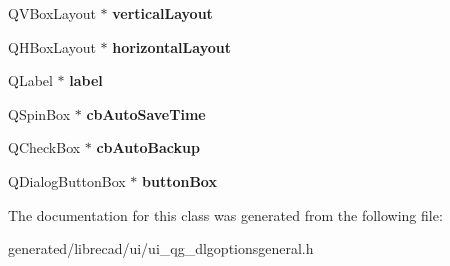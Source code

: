 \begin{DoxyCompactItemize}
\item 
\hypertarget{classUi__QG__DlgOptionsGeneral_a2503b91c8fa9d982bca55ddcf0a26d72}{Q\-V\-Box\-Layout $\ast$ {\bfseries vertical\-Layout}}\label{classUi__QG__DlgOptionsGeneral_a2503b91c8fa9d982bca55ddcf0a26d72}

\item 
\hypertarget{classUi__QG__DlgOptionsGeneral_a075230b48516015cd712c0b188033c98}{Q\-H\-Box\-Layout $\ast$ {\bfseries horizontal\-Layout}}\label{classUi__QG__DlgOptionsGeneral_a075230b48516015cd712c0b188033c98}

\item 
\hypertarget{classUi__QG__DlgOptionsGeneral_a4147639c9df9ff7d1a766b348fc38532}{Q\-Label $\ast$ {\bfseries label}}\label{classUi__QG__DlgOptionsGeneral_a4147639c9df9ff7d1a766b348fc38532}

\item 
\hypertarget{classUi__QG__DlgOptionsGeneral_af333443bb707aa48369bcfde3f42e6f0}{Q\-Spin\-Box $\ast$ {\bfseries cb\-Auto\-Save\-Time}}\label{classUi__QG__DlgOptionsGeneral_af333443bb707aa48369bcfde3f42e6f0}

\item 
\hypertarget{classUi__QG__DlgOptionsGeneral_a052e072c2644215fc0f598e88c270f19}{Q\-Check\-Box $\ast$ {\bfseries cb\-Auto\-Backup}}\label{classUi__QG__DlgOptionsGeneral_a052e072c2644215fc0f598e88c270f19}

\item 
\hypertarget{classUi__QG__DlgOptionsGeneral_a00ebfec6a13ddad79e1b77982dbf0fa8}{Q\-Dialog\-Button\-Box $\ast$ {\bfseries button\-Box}}\label{classUi__QG__DlgOptionsGeneral_a00ebfec6a13ddad79e1b77982dbf0fa8}

\end{DoxyCompactItemize}


The documentation for this class was generated from the following file\-:\begin{DoxyCompactItemize}
\item 
generated/librecad/ui/ui\-\_\-qg\-\_\-dlgoptionsgeneral.\-h\end{DoxyCompactItemize}
